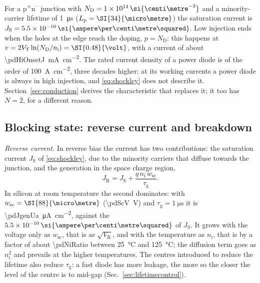 \documentclass[10pt,a4paper]{scrartcl}
\newcommand{\VR}{V_\mathrm{R}}
\newcommand{\VT}{V_\mathrm{T}}
\newcommand{\Nem}{N}                          %
\newcommand{\ND}{N_\mathrm{D}}
\newcommand{\nint}{n_\mathrm{i}}
\newcommand{\wsc}{w_\mathrm{sc}}
\newcommand{\Pp}{p\textsuperscript{+}}
\newcommand{\Nm}{n\textsuperscript{--}}
\newcommand{\cmc}{\si{\centi\metre^{-3}}}
\newcommand{\Acm}{\si{\ampere\per\centi\metre\squared}}
\begin{document}
For a \Pp\Nm{} junction with $\ND = \pdExNd\,\cmc$ and a minority-carrier lifetime of \SI{1}{\micro\second} ($L_\mathrm{p} = \SI{\pdLpOne}{\micro\metre}$) the saturation current is $J_\mathrm{S} = \pdJsShockley\,\Acm$. Low injection ends when the holes at the edge reach the doping, $p = \ND$: this happens at $v = 2\VT\ln(\ND/\nint) = \SI{\pdHiOnsetV}{\volt}$, with a current of about \SI{\pdHiOnsetJ}{\milli\ampere\per\centi\metre\squared}. The rated current density of a power diode is of the order of \SI{100}{\ampere\per\centi\metre\squared}, three decades higher: at its working currents a power diode is always in high injection, and \eqref{eq:shockley} does not describe it. Section~\ref{sec:conduction} derives the characteristic that replaces it; it too has $\Nem = 2$, for a different reason.

\subsection{Blocking state: reverse current and breakdown}
\label{sec:blockingphys}
\emph{Reverse current.} In reverse bias the current has two contributions: the saturation current $J_\mathrm{S}$ of \eqref{eq:shockley}, due to the minority carriers that diffuse towards the junction, and the generation in the space charge region,
\begin{equation}
J_\mathrm{R} = J_\mathrm{S} + \frac{q\,\nint\,\wsc}{\tau_\mathrm{g}} .
\label{eq:jgen}
\end{equation}
In silicon at room temperature the second dominates: with $\wsc = \SI{\pdScW}{\micro\metre}$ (\SI{\pdScV}{\volt}) and $\tau_\mathrm{g} = \SI{1}{\micro\second}$ it is \SI{\pdJgenUa}{\micro\ampere\per\centi\metre\squared}, against the $\pdJsShockley\,\Acm$ of $J_\mathrm{S}$. It grows with the voltage only as $\wsc$, that is as $\sqrt{\VR}$, and with the temperature as $\nint$, that is by a factor of about \num{\pdNiRatio} between \SI{25}{\celsius} and \SI{125}{\celsius}; the diffusion term goes as $\nint^2$ and prevails at the higher temperatures. The centres introduced to reduce the lifetime also reduce $\tau_\mathrm{g}$: a fast diode has more leakage, the more so the closer the level of the centre is to mid-gap (Sec.~\ref{sec:lifetimecontrol}).
\end{document}
